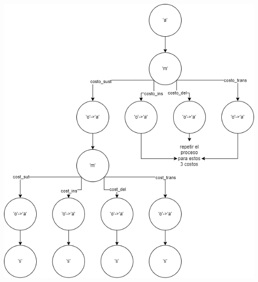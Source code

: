  \begin{minipage}[t]{0.5\textwidth}
    \includegraphics[width=\textwidth]{images/ejemplo_fuerza_bruta.png}
 \end{minipage}

